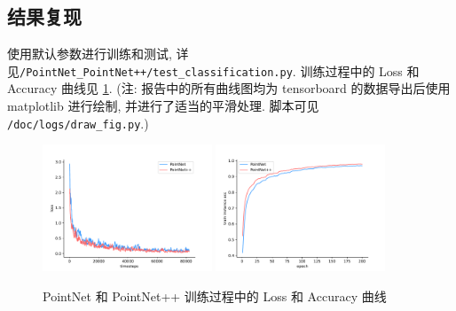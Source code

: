 \documentclass[11pt]{article}
\newcommand\1{\mathds{1}}
\begin{document}
\subsection{结果复现}
使用默认参数进行训练和测试, 详见\texttt{/PointNet\_PointNet++/test\_classification.py}. 
训练过程中的 Loss 和 Accuracy 曲线见 \cref{fig:pointnet_loss_acc}. (注: 报告中的所有曲线图均为 tensorboard 的数据导出后使用 matplotlib 进行绘制, 并进行了适当的平滑处理. 脚本可见 \texttt{/doc/logs/draw\_fig.py}.)
\begin{figure}[htbp]
    \centering
    \includegraphics[width = 0.45\textwidth]{./logs/figures/pointnet_loss.pdf}
    \includegraphics[width = 0.45\textwidth]{./logs/figures/pointnet_train_ins_acc.pdf}
    \caption{PointNet 和 PointNet++ 训练过程中的 Loss 和 Accuracy 曲线}
    \label{fig:pointnet_loss_acc}
\end{figure}
\end{document}
